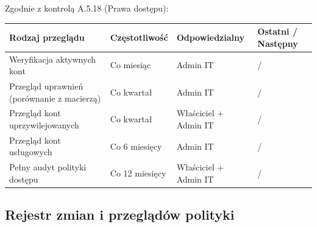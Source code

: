 \documentclass[12pt,a4paper]{article}
\begin{document}
Zgodnie z kontrolą A.5.18 (Prawa dostępu):

\begin{longtable}[]{@{}>{\raggedright\arraybackslash}p{}>{\raggedright\arraybackslash}p{}>{\raggedright\arraybackslash}p{}>{\raggedright\arraybackslash}p{}@{}}
\toprule\noalign{}
Rodzaj przeglądu & Częstotliwość & Odpowiedzialny & Ostatni / Następny \\
\midrule\noalign{}
\endhead
\bottomrule\noalign{}
\endlastfoot
Weryfikacja aktywnych kont & Co miesiąc & Admin IT & \underline{\hspace{2cm}} / \underline{\hspace{2cm}} \\
Przegląd uprawnień (porównanie z macierzą) & Co kwartał & Admin IT & \underline{\hspace{2cm}} / \underline{\hspace{2cm}} \\
Przegląd kont uprzywilejowanych & Co kwartał & Właściciel + Admin IT & \underline{\hspace{2cm}} / \underline{\hspace{2cm}} \\
Przegląd kont usługowych & Co 6 miesięcy & Admin IT & \underline{\hspace{2cm}} / \underline{\hspace{2cm}} \\
Pełny audyt polityki dostępu & Co 12 miesięcy & Właściciel + Admin IT & \underline{\hspace{2cm}} / \underline{\hspace{2cm}} \\
\end{longtable}

\subsection{Rejestr zmian i przeglądów polityki}\label{rejestr-zmian}
\end{document}
